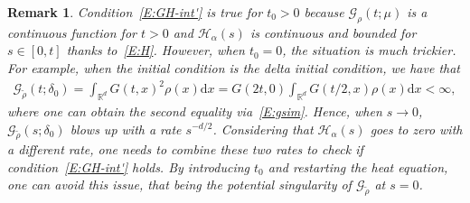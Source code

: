 \documentclass[sn-mathphys]{sn-jnl}%
\newcommand{\BR}{\mathbb{R}}
\newcommand{\ud}{\ensuremath{\mathrm{d}}}
\numberwithin{equation}{section}
\theoremstyle{thmstyleone}%
\theoremstyle{thmstyletwo}%
\newtheorem{remark}{Remark}[section]%
\theoremstyle{thmstylethree}%
\begin{document}
\begin{remark}
  Condition~\eqref{E:GH-int'} is true for $t_0>0$ because $\mathcal{G}_\rho(t;\mu)$ is a continuous
  function for $t>0$ and $\mathcal{H}_\alpha(s)$ is continuous and bounded for $s\in [0,t]$ thanks
  to~\eqref{E:H}. However, when $t_0 = 0$, the situation is much trickier. For example, when the
  initial condition is the delta initial condition, we have that
  \begin{align*}
    \mathcal{G}_{\tilde{\rho}}(t;\delta_0)
    = \int_{\BR^d} G(t,x)^2 \rho(x) \ud x
    = G(2t,0) \int_{\BR^d} G(t/2,x)\rho(x)\ud x
    < \infty,
  \end{align*}
  where one can obtain the second equality via~\eqref{E:gsim}. Hence, when $s\to 0$,
  $\mathcal{G}_{\tilde{\rho}}(s;\delta_0)$ blows up with a rate $s^{-d/2}$. Considering that
  $\mathcal{H}_\alpha(s)$ goes to zero with a different rate, one needs to combine these two rates
  to check if condition~\eqref{E:GH-int'} holds. By introducing $t_0$ and restarting the heat
  equation, one can avoid this issue, that being the potential singularity of
  $\mathcal{G}_{\tilde{\rho}}$ at $s = 0$.
\end{remark}
\end{document}
